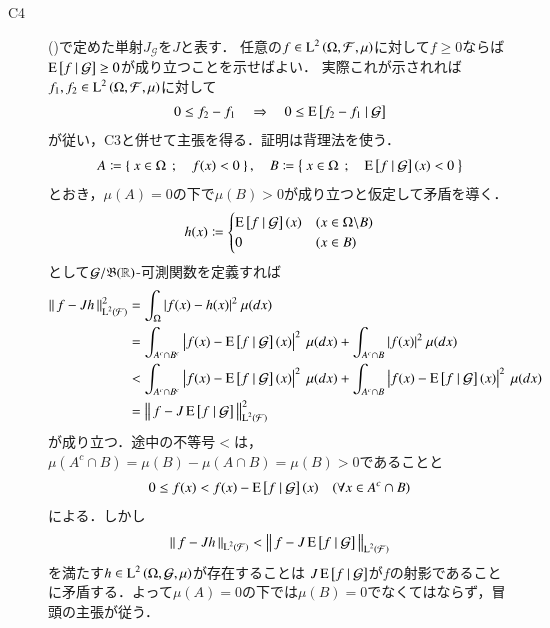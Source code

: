 \begin{prf}
\begin{description}
			\item[C4] ()で定めた単射$J_{\mathcal{G}}$を$J$と表す．
				任意の$f \in \operatorname{L}^{2} \left(\Omega, \mathcal{F},\mu\right)$に対して$f \geq 0$ならば$\operatorname{E} \left[ f \ \middle|\ \mathcal{G} \right] \geq 0$が成り立つことを示せばよい．
				実際これが示されれば$f_1,f_2 \in \operatorname{L}^{2} \left(\Omega, \mathcal{F},\mu\right)$に対して
				\begin{align}
					0 \leq f_2 - f_1 \quad \Rightarrow \quad 0 \leq \operatorname{E} \left[ f_2 - f_1 \ \middle|\ \mathcal{G} \right]
				\end{align}
				が従い，C3と併せて主張を得る．証明は背理法を使う．
				\begin{align}
					A \coloneqq \left\{\ x \in \Omega\ \, ; \quad f(x) < 0\ \right\}, \quad
					B \coloneqq \left\{\ x \in \Omega\ \, ; \quad \operatorname{E} \left[ f \ \middle|\ \mathcal{G} \right](x) < 0\ \right\}
				\end{align}
				とおき，$\mu(A)=0$の下で$\mu(B) > 0$が成り立つと仮定して矛盾を導く．
				\begin{align}
					h(x) \coloneqq
					\begin{cases}
						\operatorname{E} \left[ f \ \middle|\ \mathcal{G} \right](x) & (x \in \Omega \backslash B) \\
						0 & (x \in B)
					\end{cases}
				\end{align}
				として$\mathcal{G}/\mathfrak{B}(\mathbb{R})$-可測関数を定義すれば
				\begin{align}
					\Norm{f - Jh}{\Lp{2}{\mathcal{F}}}^2 
					&= \int_{\Omega} |f(x) - h(x)|^2\ \mu(dx) \\
					&= \int_{A^c \cap B^c} \left|f(x) - \cexp{f}{\mathcal{G}}(x)\right|^2\ \mu(dx) + \int_{A^c \cap B} |f(x)|^2\ \mu(dx) \\
					&< \int_{A^c \cap B^c} \left|f(x) - \cexp{f}{\mathcal{G}}(x)\right|^2\ \mu(dx) + \int_{A^c \cap B} \left|f(x) - \cexp{f}{\mathcal{G}}(x)\right|^2\ \mu(dx) \\
					&= \Norm{f - J\cexp{f}{\mathcal{G}}}{\Lp{2}{\mathcal{F}}}^2
				\end{align}
				が成り立つ．途中の不等号$<$は，$\mu(A^c \cap B) = \mu(B) - \mu(A \cap B) = \mu(B) > 0$であることと
				\begin{align}
					0 \leq f(x) < f(x) - \operatorname{E} \left[ f \ \middle|\ \mathcal{G} \right](x) \quad (\forall x \in A^c \cap B)
				\end{align}
				による．しかし
				\begin{align}
					\left\|\, f - Jh\, \right\|_{\operatorname{L}^{2} \left(\mathcal{F}\right)} < \left\|\, f - J\operatorname{E} \left[ f \ \middle|\ \mathcal{G} \right]\, \right\|_{\operatorname{L}^{2} \left(\mathcal{F}\right)}
				\end{align}
				を満たす$h \in \operatorname{L}^{2} \left(\Omega, \mathcal{G},\mu\right)$が存在することは
				$J\operatorname{E} \left[ f \ \middle|\ \mathcal{G} \right]$が$f$の射影であることに矛盾する．よって$\mu(A) = 0$の下では$\mu(B) = 0$でなくてはならず，冒頭の主張が従う．
			

\end{description}
\end{prf}
